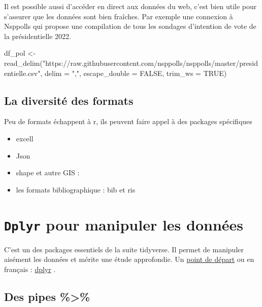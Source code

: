 \documentclass[
]{book}
\newenvironment{Shaded}{\begin{snugshade}}{\end{snugshade}}
\newcommand{\AttributeTok}[1]{\textcolor[rgb]{0.77,0.63,0.00}{#1}}
\newcommand{\ConstantTok}[1]{\textcolor[rgb]{0.00,0.00,0.00}{#1}}
\newcommand{\FunctionTok}[1]{\textcolor[rgb]{0.00,0.00,0.00}{#1}}
\newcommand{\NormalTok}[1]{#1}
\newcommand{\OtherTok}[1]{\textcolor[rgb]{0.56,0.35,0.01}{#1}}
\newcommand{\StringTok}[1]{\textcolor[rgb]{0.31,0.60,0.02}{#1}}
\providecommand{\tightlist}{%
  \setlength{\itemsep}{0pt}\setlength{\parskip}{0pt}}
\begin{document}
Il est possible aussi d'accéder en direct aux données du web, c'est bien utile pour s'assurer que les données sont bien fraîches. Par exemple une connexion à Nsppolls qui propose une compilation de tous les sondages d'intention de vote de la présidentielle 2022.

\begin{Shaded}
\begin{Highlighting}[]
\NormalTok{df\_pol }\OtherTok{\textless{}{-}} \FunctionTok{read\_delim}\NormalTok{(}\StringTok{"https://raw.githubusercontent.com/nsppolls/nsppolls/master/presidentielle.csv"}\NormalTok{, }
                     \AttributeTok{delim =} \StringTok{","}\NormalTok{, }\AttributeTok{escape\_double =} \ConstantTok{FALSE}\NormalTok{, }\AttributeTok{trim\_ws =} \ConstantTok{TRUE}\NormalTok{)}
\end{Highlighting}
\end{Shaded}

\hypertarget{la-diversituxe9-des-formats}{%
\subsection{La diversité des formats}\label{la-diversituxe9-des-formats}}

Peu de formats échappent à r, ils peuvent faire appel à des packages spécifiques

\begin{itemize}
\tightlist
\item
  excell
\item
  Json
\item
  shape et autre GIS :
\item
  les formats bibliographique : bib et ris
\end{itemize}

\hypertarget{dplyr-pour-manipuler-les-donnuxe9es}{%
\section{\texorpdfstring{\texttt{Dplyr} pour manipuler les données}{Dplyr pour manipuler les données}}\label{dplyr-pour-manipuler-les-donnuxe9es}}

C'est un des packages essentiels de la suite tidyverse. Il permet de manipuler aisément les données et mérite une étude approfondie. Un \href{https://dplyr.tidyverse.org/articles/dplyr.html}{point de départ} ou en français : \href{http://larmarange.github.io/analyse-R/manipuler-les-donnees-avec-dplyr.html}{dplyr} .

\hypertarget{des-pipes}{%
\subsection{Des pipes \%\textgreater\%}\label{des-pipes}}
\end{document}
